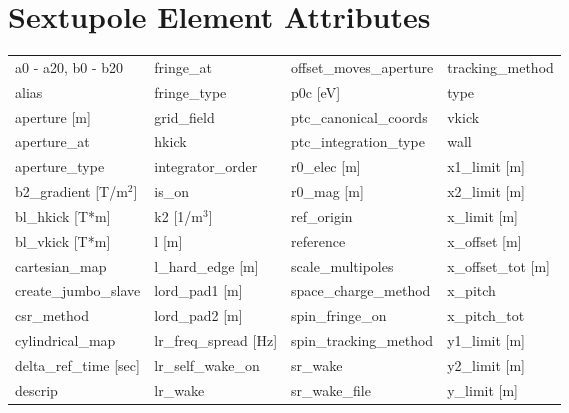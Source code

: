  \section{Sextupole Element Attributes}
 \label{s:list.sextupole}
 
 \begin{tabular}{llll} \toprule
a0 - a20, b0 - b20             & fringe_at                      & offset_moves_aperture          & tracking_method                \\
alias                          & fringe_type                    & p0c [eV]                       & type                           \\
aperture [m]                   & grid_field                     & ptc_canonical_coords           & vkick                          \\
aperture_at                    & hkick                          & ptc_integration_type           & wall                           \\
aperture_type                  & integrator_order               & r0_elec [m]                    & x1_limit [m]                   \\
b2_gradient [T/m$^2$]          & is_on                          & r0_mag [m]                     & x2_limit [m]                   \\
bl_hkick [T*m]                 & k2 [1/m$^3$]                   & ref_origin                     & x_limit [m]                    \\
bl_vkick [T*m]                 & l [m]                          & reference                      & x_offset [m]                   \\
cartesian_map                  & l_hard_edge [m]                & scale_multipoles               & x_offset_tot [m]               \\
create_jumbo_slave             & lord_pad1 [m]                  & space_charge_method            & x_pitch                        \\
csr_method                     & lord_pad2 [m]                  & spin_fringe_on                 & x_pitch_tot                    \\
cylindrical_map                & lr_freq_spread [Hz]            & spin_tracking_method           & y1_limit [m]                   \\
delta_ref_time [sec]           & lr_self_wake_on                & sr_wake                        & y2_limit [m]                   \\
descrip                        & lr_wake                        & sr_wake_file                   & y_limit [m]                    \\

\end{tabular}
